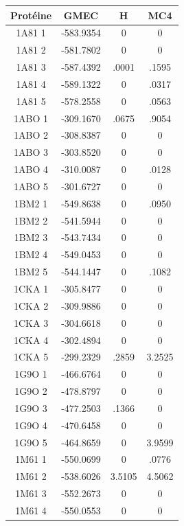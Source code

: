 \documentclass[a4paper,12pt]{article}
\begin{document}
    \begin{table}[h]
      \centering

      \begin{tabular}{|c|c|c|c|}

        \hline
        Protéine & GMEC & H & MC4 \\
        \hline
        1A81 1 & -583.9354 & 0 & 0 \\
        1A81 2 & -581.7802 & 0 & 0 \\
        1A81 3 & -587.4392 & .0001 & .1595 \\
        1A81 4 & -589.1322 & 0 & .0317 \\
        1A81 5 & -578.2558 & 0 & .0563 \\
        1ABO 1 & -309.1670 & .0675 & .9054 \\
        1ABO 2 & -308.8387 & 0 & 0 \\
        1ABO 3 & -303.8520 & 0 & 0 \\
        1ABO 4 & -310.0087 & 0 & .0128 \\
        1ABO 5 & -301.6727 & 0 & 0 \\
        1BM2 1 & -549.8638 & 0 & .0950 \\
        1BM2 2 & -541.5944 & 0 & 0 \\
        1BM2 3 & -543.7434 & 0 & 0 \\
        1BM2 4 & -549.0453 & 0 & 0 \\
        1BM2 5 & -544.1447 & 0 & .1082 \\
        1CKA 1 & -305.8477 & 0 & 0 \\
        1CKA 2 & -309.9886 & 0 & 0 \\
        1CKA 3 & -304.6618 & 0 & 0 \\
        1CKA 4 & -302.4894 & 0 & 0 \\
        1CKA 5 & -299.2329 & .2859 & 3.2525 \\
        1G9O 1 & -466.6764 & 0 & 0 \\
        1G9O 2 & -478.8797 & 0 & 0 \\
        1G9O 3 & -477.2503 & .1366 & 0 \\
        1G9O 4 & -470.6458 & 0 & 0 \\
        1G9O 5 & -464.8659 & 0 & 3.9599 \\
        1M61 1 & -550.0699 & 0 & .0776 \\
        1M61 2 & -538.6026 & 3.5105 & 4.5062 \\
        1M61 3 & -552.2673 & 0 & 0 \\
        1M61 4 & -550.0553 & 0 & 0 \\

\end{tabular}
\end{table}
\end{document}
